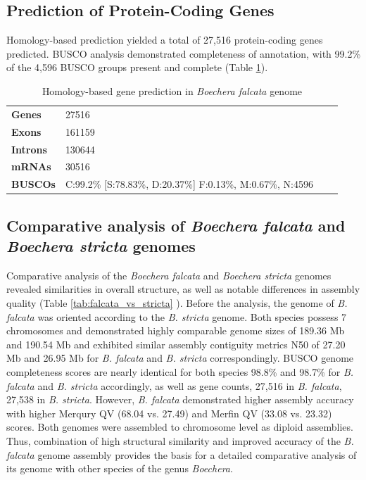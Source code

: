 \documentclass[9pt,twocolumn,twoside,lineno]{gsag3jnl}
\begin{document}
\subsection{Prediction of Protein-Coding Genes}

Homology-based prediction yielded a total of 27,516 protein-coding genes predicted. BUSCO analysis demonstrated completeness of annotation, with 99.2\% of the 4,596 BUSCO groups present and complete (Table \ref{tab:genes_annotation}).

\begin{table}[p]
\centering
\caption{Homology-based gene prediction in \textit{Boechera falcata} genome }
\begin{tableminipage}{\textwidth}
\begin{tabularx}{\textwidth}{@{}XXXX@{}}
\hline
\textbf{Genes} & 27516                                                          \\
\textbf{Exons}          & 161159                                                         \\
\textbf{Introns}        & 130644                                                         \\
\textbf{mRNAs}          & 30516                                                          \\
\textbf{BUSCOs}         & C:99.2\% {[}S:78.83\%, D:20.37\%{]} F:0.13\%, M:0.67\%, N:4596 \\
\hline
\end{tabularx}
\label{tab:genes_annotation}
\end{tableminipage}
\end{table}

\subsection{Comparative analysis of \textit{Boechera falcata} and \textit{Boechera stricta} genomes}

Comparative analysis of the \textit{Boechera falcata} and \textit{Boechera stricta} genomes revealed similarities in overall structure, as well as notable differences in assembly quality (Table \ref{tab:falcata_vs_stricta} ). Before the analysis, the genome of \textit{B. falcata} was oriented according to the \textit{B. stricta} genome. Both species possess 7 chromosomes and demonstrated highly comparable genome sizes of 189.36 Mb and 190.54 Mb and exhibited similar assembly contiguity metrics N50 of 27.20 Mb and 26.95 Mb for \textit{B. falcata} and \textit{B. stricta} correspondingly. BUSCO genome completeness scores are nearly identical for both species 98.8\% and 98.7\% for \textit{B. falcata} and \textit{B. stricta} accordingly, as well as gene counts, 27,516 in \textit{B. falcata}, 27,538 in \textit{B. stricta}. However, \textit{B. falcata} demonstrated higher assembly accuracy with higher Merqury QV (68.04 vs. 27.49) and Merfin QV (33.08 vs. 23.32) scores. Both genomes were assembled to chromosome level as diploid assemblies. Thus, combination of high structural similarity and improved accuracy of the \textit{B. falcata} genome assembly provides the basis for a detailed comparative analysis of its genome with other species of the genus \textit{Boechera}.
\end{document}
